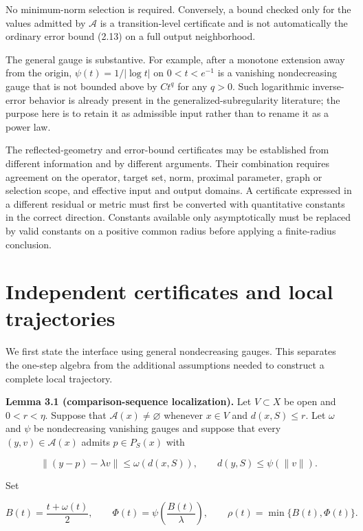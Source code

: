 \documentclass[11pt,a4paper]{article}
\theoremstyle{plain}
\theoremstyle{definition}
\theoremstyle{remark}
\begin{document}
No minimum-norm selection is required. Conversely, a bound checked only
for the values admitted by \(\mathcal A\) is a transition-level
certificate and is not automatically the ordinary error bound (2.13) on
a full output neighborhood.

The general gauge is substantive. For example, after a monotone
extension away from the origin, \(\psi(t)=1/|\log t|\) on \(0<t<e^{-1}\)
is a vanishing nondecreasing gauge that is not bounded above by \(Ct^q\)
for any \(q>0\). Such logarithmic inverse-error behavior is already
present in the generalized-subregularity literature; the purpose here is
to retain it as admissible input rather than to rename it as a power
law.

The reflected-geometry and error-bound certificates may be established
from different information and by different arguments. Their combination
requires agreement on the operator, target set, norm, proximal
parameter, graph or selection scope, and effective input and output
domains. A certificate expressed in a different residual or metric must
first be converted with quantitative constants in the correct direction.
Constants available only asymptotically must be replaced by valid
constants on a positive common radius before applying a finite-radius
conclusion.

\hypertarget{independent-certificates-and-local-trajectories}{%
\section{Independent certificates and local
trajectories}\label{independent-certificates-and-local-trajectories}}

We first state the interface using general nondecreasing gauges. This
separates the one-step algebra from the additional assumptions needed to
construct a complete local trajectory.

\textbf{Lemma 3.1 (comparison-sequence localization).} Let
\(V\subset X\) be open and \(0<r<\eta\). Suppose that
\(\mathcal A(x)\ne\varnothing\) whenever \(x\in V\) and \(d(x,S)\le r\).
Let \(\omega\) and \(\psi\) be nondecreasing vanishing gauges and
suppose that every \((y,v)\in\mathcal A(x)\) admits \(p\in P_S(x)\) with

\[
\|(y-p)-\lambda v\|\le\omega(d(x,S)),
\qquad
d(y,S)\le\psi(\|v\|).
\]

Set

\[
B(t)=\frac{t+\omega(t)}2,
\qquad
\Phi(t)=\psi\!\left(\frac{B(t)}\lambda\right),
\qquad
\rho(t)=\min\{B(t),\Phi(t)\}.
\tag{3.0a}
\]
\end{document}
